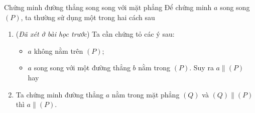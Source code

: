 \begin{dang}{Chứng minh đường thẳng song song với mặt phẳng}
	Để chứng minh $a$ song song $(P)$, ta thường sử dụng một trong hai cách sau
	\begin{enumerate}[\iconMT]
		\item {} (\textit{Đã xét ở bài học trước}) Ta cần chứng tỏ các ý sau:
		\begin{itemize}
			\item [$\bullet$] $a$ không nằm trên $(P)$;
			\item [$\bullet$] $a$ song song với một đường thẳng $b$ nằm trong $(P)$. Suy ra $a\parallel (P)$ hay  
		\end{itemize}
		\item {} Ta chứng minh đường thẳng $a$ nằm trong mặt
		phẳng $(Q)$ và $(Q)\parallel (P)$ thì $a \parallel (P)$.
	\end{enumerate}
\end{dang}

